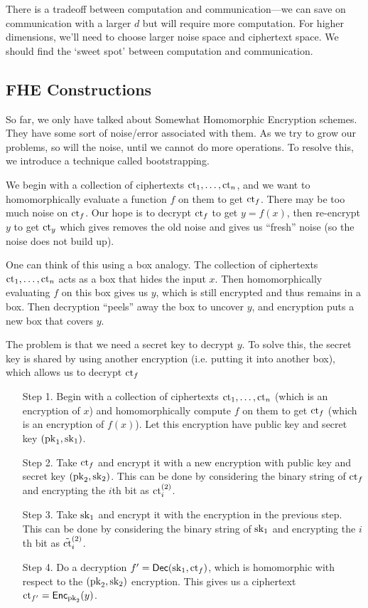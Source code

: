 There is a tradeoff between computation and communication---we can save on communication with a larger $d$ but will require more computation. For higher dimensions, we'll need to choose larger noise space and ciphertext space. We should find the `sweet spot' between computation and communication.

\subsection{FHE Constructions}

So far, we only have talked about Somewhat Homomorphic Encryption schemes. They have some sort of noise/error associated with them. As we try to grow our problems, so will the noise, until we cannot do more operations. To resolve this, we introduce a technique called bootstrapping.

We begin with a collection of ciphertexts $\mathrm{ct}_1, \dots, \mathrm{ct}_n$, and we want to homomorphically evaluate a function $f$ on them to get $\mathrm{ct}_f$. There may be too much noise on $\mathrm{ct}_f$. Our hope is to decrypt $\mathrm{ct}_f$ to get $y= f(x)$, then re-encrypt $y$ to get $\mathrm{ct}_y$ which gives removes the old noise and gives us ``fresh'' noise (so the noise does not build up).

\begin{center}
    \def\svgwidth{0.55\columnwidth}
    
\end{center}

One can think of this using a box analogy. The collection of ciphertexts $\mathrm{ct}_1, \dots, \mathrm{ct}_n$ acts as a box that hides the input $x$. Then homomorphically evaluating $f$ on this box gives us $y$, which is still encrypted and thus remains in a box. Then decryption ``peels'' away the box to uncover $y$, and encryption puts a new box that covers $y$.

The problem is that we need a secret key to decrypt $y$. To solve this, the secret key is shared by using another encryption (i.e. putting it into another box), which allows us to decrypt $\mathrm{ct}_f$

\begin{enumerate}
    \item[Step 1.] Begin with a collection of ciphertexts $\mathrm{ct}_1, \dots, \mathrm{ct}_n$ (which is an encryption of $x$) and homomorphically compute $f$ on them to get $\mathrm{ct}_f$ (which is an encryption of $f(x)$). Let this encryption have public key and secret key $(\mathrm{pk}_1, \mathrm{sk}_1)$.
    \item[Step 2.] Take $\mathrm{ct}_f$ and encrypt it with a new encryption with public key and secret key $(\mathrm{pk}_2, \mathrm{sk}_2)$. This can be done by considering the binary string of $\mathrm{ct}_f$ and encrypting the $i$th bit as $\mathrm{ct}_i^{(2)}$.
    \item[Step 3.] Take $\mathrm{sk}_1$ and encrypt it with the encryption in the previous step. This can be done by considering the binary string of $\mathrm{sk}_1$ and encrypting the $i$th bit as $\tilde{\mathrm{ct}}_i^{(2)}$.
    \item[Step 4.] Do a decryption $f' = \operatorname{\mathsf{Dec}}(\mathrm{sk}_1, \mathrm{ct}_f)$, which is homomorphic with respect to the $(\mathrm{pk}_2, \mathrm{sk}_2)$ encryption. This gives us a ciphertext $\mathrm{ct}_{f'} = \operatorname{\mathsf{Enc}}_{\mathrm{pk}_2}(y)$.
\end{enumerate}

